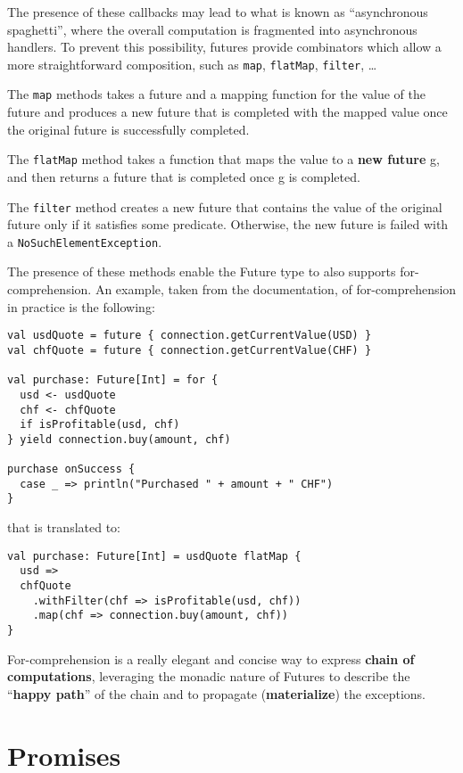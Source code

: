 The presence of these callbacks may lead to what is known as
``asynchronous spaghetti'', where the overall computation is fragmented
into asynchronous handlers. To prevent this possibility, futures provide
combinators which allow a more straightforward composition, such as
\texttt{map}, \texttt{flatMap}, \texttt{filter}, \ldots{}

The \texttt{map} methods takes a future and a mapping function for the
value of the future and produces a new future that is completed with the
mapped value once the original future is successfully completed.

The \texttt{flatMap} method takes a function that maps the value to a
\textbf{new future} g, and then returns a future that is completed once
g is completed.

The \texttt{filter} method creates a new future that contains the value
of the original future only if it satisfies some predicate. Otherwise,
the new future is failed with a \texttt{NoSuchElementException}.

The presence of these methods enable the Future type to also supports
for-comprehension. An example, taken from the documentation, of
for-comprehension in practice is the following:

\begin{verbatim}
val usdQuote = future { connection.getCurrentValue(USD) }
val chfQuote = future { connection.getCurrentValue(CHF) }

val purchase: Future[Int] = for {
  usd <- usdQuote
  chf <- chfQuote
  if isProfitable(usd, chf)
} yield connection.buy(amount, chf)

purchase onSuccess {
  case _ => println("Purchased " + amount + " CHF")
}
\end{verbatim}

that is translated to:

\begin{verbatim}
val purchase: Future[Int] = usdQuote flatMap {
  usd =>
  chfQuote
    .withFilter(chf => isProfitable(usd, chf))
    .map(chf => connection.buy(amount, chf))
}
\end{verbatim}

For-comprehension is a really elegant and concise way to express
\textbf{chain of computations}, leveraging the monadic nature of Futures
to describe the ``\textbf{happy path}'' of the chain and to propagate
(\textbf{materialize}) the exceptions.


\section{Promises}\label{promises}

